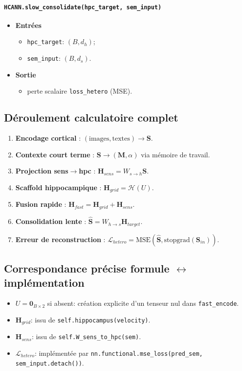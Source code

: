 \documentclass[12pt,a4paper]{article}
\begin{document}
\paragraph{\texttt{HCANN.slow\_consolidate(hpc\_target, sem\_input)}}
\begin{itemize}[leftmargin=*]
    \item \textbf{Entrées}
    \begin{itemize}
        \item \texttt{hpc\_target}: $(B,d_h)$;
        \item \texttt{sem\_input}: $(B,d_s)$.
    \end{itemize}
    \item \textbf{Sortie}
    \begin{itemize}
        \item perte scalaire \texttt{loss\_hetero} (MSE).
    \end{itemize}
\end{itemize}

\subsection{Déroulement calculatoire complet}
\begin{enumerate}[leftmargin=*]
    \item \textbf{Encodage cortical} : $(\text{images},\text{textes})\rightarrow \mathbf{S}$.
    \item \textbf{Contexte court terme} : $\mathbf{S}\rightarrow (\mathbf{M},\alpha)$ via mémoire de travail.
    \item \textbf{Projection sens$\rightarrow$hpc} : $\mathbf{H}_{sens}=W_{s\to h}\mathbf{S}$.
    \item \textbf{Scaffold hippocampique} : $\mathbf{H}_{grid}=\mathcal{H}(U)$.
    \item \textbf{Fusion rapide} : $\mathbf{H}_{fast}=\mathbf{H}_{grid}+\mathbf{H}_{sens}$.
    \item \textbf{Consolidation lente} : $\hat{\mathbf{S}}=W_{h\to s}\mathbf{H}_{target}$.
    \item \textbf{Erreur de reconstruction} : $\mathcal{L}_{hetero}=\mathrm{MSE}(\hat{\mathbf{S}},\mathrm{stopgrad}(\mathbf{S}_{in}))$.
\end{enumerate}

\subsection{Correspondance précise formule $\leftrightarrow$ implémentation}
\begin{itemize}[leftmargin=*]
    \item $U=\mathbf{0}_{B\times2}$ si absent: création explicite d'un tenseur nul dans \texttt{fast\_encode}.
    \item $\mathbf{H}_{grid}$: issu de \texttt{self.hippocampus(velocity)}.
    \item $\mathbf{H}_{sens}$: issu de \texttt{self.W\_sens\_to\_hpc(sem)}.
    \item $\mathcal{L}_{hetero}$: implémentée par \texttt{nn.functional.mse\_loss(pred\_sem, sem\_input.detach())}.
\end{itemize}
\end{document}
